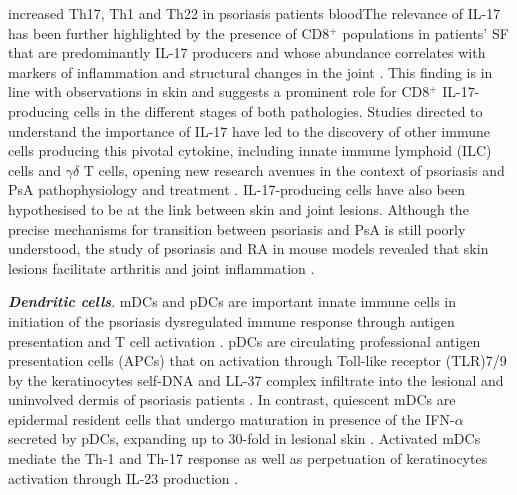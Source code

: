 increased Th17, Th1 and Th22 in psoriasis patients bloodThe relevance of IL-17 has been further highlighted by the presence of CD8$^+$ populations in patients’ SF that are predominantly IL-17 producers and whose abundance correlates with markers of inflammation and structural changes in the joint \parencite{Menon2014}. This finding is in line with observations in skin and suggests a prominent role for CD8$^+$ IL-17-producing cells in the different stages of both pathologies. Studies directed to understand the importance of IL-17 have led to the discovery of other immune cells producing this pivotal cytokine, including innate immune lymphoid (ILC) cells and $\gamma$$\delta$ T cells, opening new research avenues in the context of psoriasis and PsA pathophysiology and treatment \parencite{Meglio2014,Leijten2015}. IL-17-producing cells have also been hypothesised to be at the link between skin and joint lesions. Although the precise mechanisms for transition between psoriasis and PsA is still poorly understood, the study of psoriasis and RA in mouse models revealed that skin lesions facilitate arthritis and joint inflammation \parencite{Yamamoto2015}. %

\textbf{\textit{Dendritic cells}}. mDCs and pDCs are important innate immune cells in initiation of the psoriasis dysregulated immune response through antigen presentation and T cell activation \parencite{Mahil2016}. pDCs are circulating professional antigen presentation cells (APCs) that on activation through Toll-like receptor (TLR)7/9 by the keratinocytes self-DNA and LL-37 complex infiltrate into the lesional and uninvolved dermis of psoriasis patients \parencite{Nestle2005, Lande2007}. In contrast, quiescent mDCs are epidermal resident cells that undergo maturation in presence of the IFN-$\alpha$ secreted by pDCs, expanding up to 30-fold in lesional skin \parencite{Zaba2007}. Activated mDCs mediate the Th-1 and Th-17 response as well as perpetuation of keratinocytes activation through IL-23 production \parencite{Lee2004}. %



